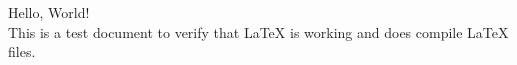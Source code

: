 \documentclass[a4paper]{article}
\begin{document}
    Hello, World!\\
    This is a test document to verify that LaTeX is working and does compile LaTeX files.
\end{document}
